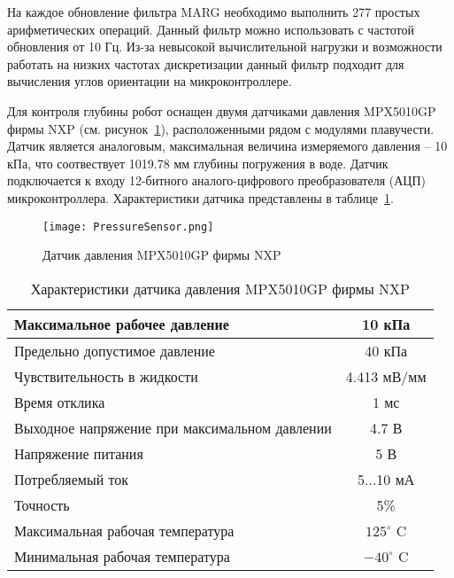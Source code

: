 На каждое обновление фильтра MARG необходимо выполнить 277 простых арифметических операций. Данный фильтр можно использовать с частотой обновления от 10 Гц. Из-за невысокой вычислительной нагрузки и возможности работать на низких частотах дискретизации данный фильтр подходит для вычисления углов ориентации на микроконтроллере. 




Для контроля глубины робот оснащен двумя датчиками давления MPX5010GP фирмы NXP (см. рисунок~\ref{PressureSensor}), расположенными рядом с модулями плавучести. Датчик является аналоговым, максимальная величина измеряемого давления -- 10 кПа, что соотвествует 1019.78 мм глубины погружения в воде. Датчик подключается к входу 12-битного аналого-цифрового преобразователя (АЦП) микроконтроллера. Характеристики датчика представлены в таблице~\ref{tabPressure}.

\begin{figure}[h]
	\centering
	\texttt{[image: PressureSensor.png]}%
	\caption{Датчик давления MPX5010GP фирмы NXP}
	\label{PressureSensor}
\end{figure}

\begin{table}[h]
	\centering
	\caption{Характеристики датчика давления MPX5010GP фирмы NXP}\label{tabPressure}
	\begin{tabular}{|l|c|}
		\hline
		Максимальное рабочее давление	&	10 кПа 	\\ \hline
		Предельно допустимое давление & 40 кПа \\ \hline
		Чувствительность в жидкости	& 4.413 мВ/мм \\ \hline
		Время отклика 	& 1 мс \\ \hline
		Выходное напряжение при максимальном давлении	&  4.7 В\\ \hline
		Напряжение питания 	& 5 В\\ \hline	
		Потребляемый ток	& 5...10 мА\\ \hline	
		Точность	& 5\% \\ \hline
		Максимальная рабочая температура	&	$125^\circ$ C 	\\ \hline
		Минимальная рабочая температура 	&	$-40^\circ$ C \\ \hline
	\end{tabular}
\end{table}

